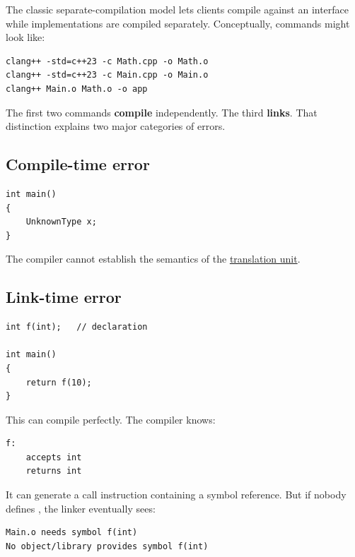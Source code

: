 The classic separate-compilation model lets clients compile against an interface while implementations are compiled separately. Conceptually, commands might look like:

\begin{verbatim}
clang++ -std=c++23 -c Math.cpp -o Math.o
clang++ -std=c++23 -c Main.cpp -o Main.o
clang++ Main.o Math.o -o app
\end{verbatim}

The first two commands \textbf{compile} independently. The third \textbf{links}. That distinction explains two major categories of errors.

\subsection{Compile-time error}\label{01-foundations-i-ch002-compile-time-error}

\hypertarget{01-foundations-i-ch002-compile-time-error}{}

\begin{verbatim}
int main()
{
    UnknownType x;
}
\end{verbatim}

The compiler cannot establish the semantics of the \hyperref[appendix-806686359e1b]{translation unit}.

\subsection{Link-time error}\label{01-foundations-i-ch002-link-time-error}

\hypertarget{01-foundations-i-ch002-link-time-error}{}

\begin{verbatim}
int f(int);   // declaration

int main()
{
    return f(10);
}
\end{verbatim}

This can compile perfectly. The compiler knows:

\begin{verbatim}
f:
    accepts int
    returns int
\end{verbatim}

It can generate a call instruction containing a symbol reference. But if nobody defines , the linker eventually sees:

\begin{verbatim}
Main.o needs symbol f(int)
No object/library provides symbol f(int)
\end{verbatim}


